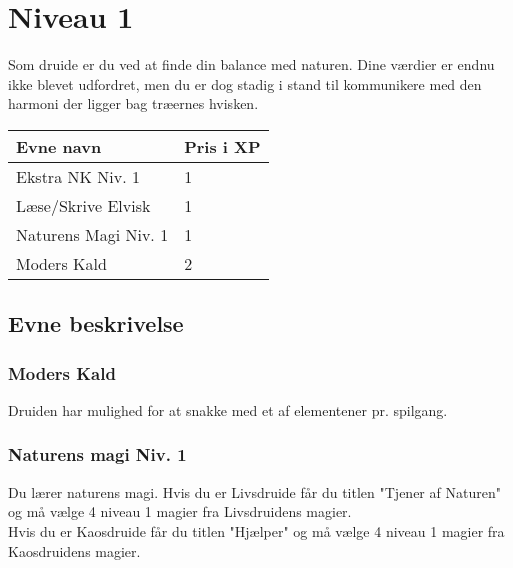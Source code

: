 \chapter{Niveau 1}
Som druide er du ved at finde din balance med naturen. Dine værdier er endnu ikke blevet udfordret, men du er dog stadig i stand til kommunikere med den harmoni der ligger bag træernes hvisken. 

\begin{table}[H]
    \centering
    \begin{tabular}{|p{}|p{}|}
    \rowcolor{cerulean!80}\hline
        Evne navn & Pris i XP \\\hline
        Ekstra NK Niv. 1& 1\\\hline
        Læse/Skrive Elvisk & 1\\\hline
        Naturens Magi Niv. 1& 1\\\hline
        Moders Kald & 2\\\hline
    \end{tabular}
\end{table}

\section{Evne beskrivelse}





\subsection{Moders Kald}
Druiden har mulighed for at snakke med et af elementener pr. spilgang.

\subsection{Naturens magi Niv. 1}
Du lærer naturens magi. Hvis du er Livsdruide får du titlen "Tjener af Naturen" og må vælge 4 niveau 1 magier fra Livsdruidens magier.\\ Hvis du er Kaosdruide får du titlen "Hjælper" og må vælge 4 niveau 1 magier fra Kaosdruidens magier.